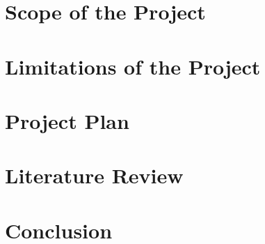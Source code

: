 \documentclass[12pt,a4paper]{article}
\begin{document}
\section{Scope of the Project}

\section{Limitations of the Project}

\section{Project Plan}

\section{Literature Review}

\section{Conclusion}

\printbibliography[title=References]
\end{document}
